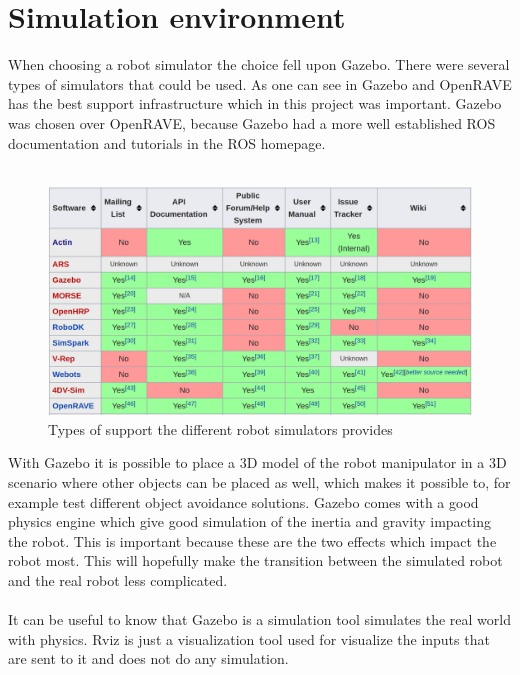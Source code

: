 \section{Simulation environment}
When choosing a robot simulator the choice fell upon Gazebo. There were several types of simulators that could be used. As one can see in  Gazebo and OpenRAVE has the best support infrastructure which in this project was important\cite{wikiRobSim}. Gazebo was chosen over OpenRAVE, because Gazebo had a more well established ROS documentation and tutorials in the ROS homepage\cite{ROS}.\\\\
\begin{figure}[htbp]
  \centering
  \includegraphics[width=.9\textwidth]{img/WikipTableRobSim.png}
  \caption{Types of support the different robot simulators provides\cite{wikiRobSim}}
  \label{fig:infra}
\end{figure}
With Gazebo it is possible to place a 3D model of the robot manipulator in a 3D scenario where other objects can be placed as well, which makes it possible to, for example test different object avoidance solutions. Gazebo comes with a good physics engine which give good simulation of the inertia and gravity impacting the robot\cite{Gazebo}. This is important because these are the two effects which impact the robot most. This will hopefully make the transition between the simulated robot and the real robot less complicated. \\\\
It can be useful to know that Gazebo is a simulation tool simulates the real world with physics. Rviz is just a visualization tool used for visualize the inputs that are sent to it and does not do any simulation. 




